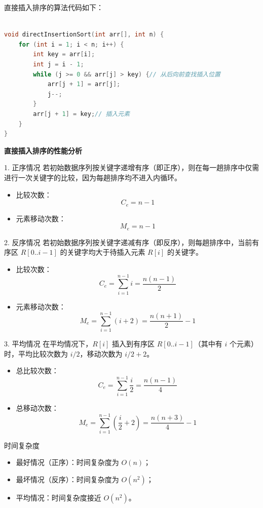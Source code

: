 \documentclass[lang=cn,newtx,10pt,scheme=chinese]{../elegantbook}
\begin{document}
直接插入排序的算法代码如下：
\begin{lstlisting}[language=C++, caption=直接插入排序的算法代码]

void directInsertionSort(int arr[], int n) {
    for (int i = 1; i < n; i++) {
        int key = arr[i];
        int j = i - 1;
        while (j >= 0 && arr[j] > key) {// 从后向前查找插入位置
            arr[j + 1] = arr[j];
            j--;
        }
        arr[j + 1] = key;// 插入元素
    }
}
\end{lstlisting}

\textbf{直接插入排序的性能分析}

1. 正序情况  
   若初始数据序列按关键字递增有序（即正序），则在每一趟排序中仅需进行一次关键字的比较，因为每趟排序均不进入内循环。  
   \begin{itemize}
     \item 比较次数：  
       \[
       C_e = n - 1
       \]
     \item 元素移动次数：  
       \[
       M_e = n - 1
       \]
   \end{itemize}

2. 反序情况  
   若初始数据序列按关键字递减有序（即反序），则每趟排序中，当前有序区 $R[0..i-1]$ 的关键字均大于待插入元素 $R[i]$ 的关键字。  
   \begin{itemize}
     \item 比较次数：  
       \[
       C_e = \sum_{i=1}^{n-1} i = \frac{n(n-1)}{2}
       \]
     \item 元素移动次数：  
       \[
       M_e = \sum_{i=1}^{n-1} (i + 2) = \frac{n(n+1)}{2} - 1
       \]
   \end{itemize}

3. 平均情况  
   在平均情况下，$R[i]$ 插入到有序区 $R[0..i-1]$（其中有 $i$ 个元素）时，平均比较次数为 $i/2$，移动次数为 $i/2 + 2$。  
   \begin{itemize}
     \item 总比较次数：  
       \[
       C_e = \sum_{i=1}^{n-1} \frac{i}{2} = \frac{n(n-1)}{4}
       \]
     \item 总移动次数：  
       \[
       M_e = \sum_{i=1}^{n-1} \left(\frac{i}{2} + 2\right) = \frac{n(n+3)}{4} - 1
       \]
   \end{itemize}

时间复杂度  
\begin{itemize}
  \item 最好情况（正序）：时间复杂度为 $O(n)$；
  \item 最坏情况（反序）：时间复杂度为 $O(n^2)$；
  \item 平均情况：时间复杂度接近 $O(n^2)$。
\end{itemize}
\end{document}
